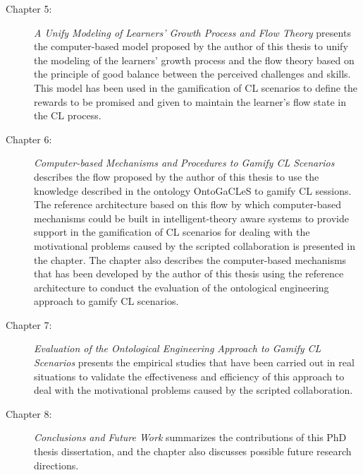 \begin{description}
\item[Chapter 5:]
\emph{A Unify Modeling of Learners' Growth Process and Flow Theory} presents the computer-based model proposed by the author of this thesis to unify the modeling of the learners' growth process and the flow theory based on the principle of good balance between the perceived challenges and skills. This model has been used in the gamification of CL scenarios to define the rewards to be promised and given to maintain the learner's flow state in the CL process.

\item[Chapter 6:]
\emph{Computer-based Mechanisms and Procedures to Gamify CL Scenarios} describes the flow proposed by the author of this thesis to use the knowledge described in the ontology OntoGaCLeS to gamify CL sessions. The reference architecture based on this flow by which computer-based mechanisms could be built in intelligent-theory aware systems to provide support in the gamification of CL scenarios for dealing with the motivational problems caused by the scripted collaboration is presented in the chapter. The chapter also describes the computer-based mechanisms that has been developed by the author of this thesis using the reference architecture to conduct the evaluation of the ontological engineering approach to gamify CL scenarios.

\item[Chapter 7:]
\emph{Evaluation of the Ontological Engineering Approach to Gamify CL Scenarios} presents the empirical studies that have been carried out in real situations to validate the effectiveness and efficiency of this approach to deal with the motivational problems caused by the scripted collaboration.

\item[Chapter 8:]
\emph{Conclusions and Future Work} summarizes the contributions of this PhD thesis dissertation, and the chapter also discusses possible future research directions.

\end{description}




